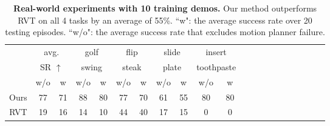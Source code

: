 \begin{table}[!t]
\centering
\scriptsize
\begin{tabular}{ccccccccccccccccccccc}
\toprule
       & \multicolumn{2}{c}{avg.}   & \multicolumn{2}{c}{golf}   & \multicolumn{2}{c}{flip}  & \multicolumn{2}{c}{slide} & \multicolumn{2}{c}{insert}       \\
       & \multicolumn{2}{c}{SR $\uparrow$}   & \multicolumn{2}{c}{swing} & \multicolumn{2}{c}{steak}  & \multicolumn{2}{c}{plate}  & \multicolumn{2}{c}{toothpaste}  \\ \rule{0pt}{3ex} 
      & w/o        & w & w/o        & w             & w/o          & w           & w/o          & w             & w/o          & w             \\ \midrule
Ours   &77 &71 & 88         & 80            & 77           & 70          & 61           & 55            & 80           & 80            \\
RVT    &19 &16 & 14         & 10            & 44           & 40          & 17           & 15            & 0            & 0             \\ \bottomrule
\end{tabular}
\caption{\textbf{Real-world experiments with 10 training demos.} Our method outperforms RVT on all 4 tasks by an average of 55\%. ``w": the average success rate over 20 testing episodes. ``w/o": the average success rate that excludes motion planner failure.}
\label{table:real-world}
\vspace*{-0.2cm}
\end{table}
